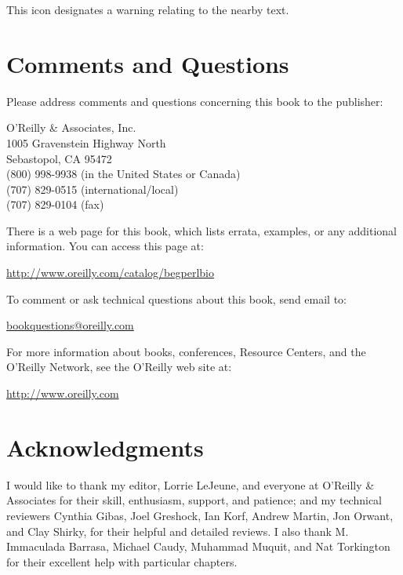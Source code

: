 \begin{adjustwidth}{2cm}{2cm}
This icon designates a warning relating to the nearby text.
\end{adjustwidth}

\section*{Comments and Questions}
Please address comments and questions concerning this book to the publisher:

O'Reilly \& Associates, Inc.\\
1005 Gravenstein Highway North\\
Sebastopol, CA 95472\\
(800) 998-9938 (in the United States or Canada)\\
(707) 829-0515 (international/local)\\
(707) 829-0104 (fax)

There is a web page for this book, which lists errata, examples, or any additional information. You can access this page at:

\href{http://www.oreilly.com/catalog/begperlbio}{http://www.oreilly.com/catalog/begperlbio}

To comment or ask technical questions about this book, send email to:

\href{bookquestions@oreilly.com}{bookquestions@oreilly.com}

For more information about books, conferences, Resource Centers, and the O'Reilly Network, see the O'Reilly web site at:

\href{http://www.oreilly.com}{http://www.oreilly.com}

\section*{Acknowledgments}
I would like to thank my editor, Lorrie LeJeune, and everyone at O'Reilly \& Associates for their skill, enthusiasm, support, and patience; and my technical reviewers Cynthia Gibas, Joel Greshock, Ian Korf, Andrew Martin, Jon Orwant, and Clay Shirky, for their helpful and detailed reviews. I also thank M. Immaculada Barrasa, Michael Caudy, Muhammad Muquit, and Nat Torkington for their excellent help with particular chapters.

